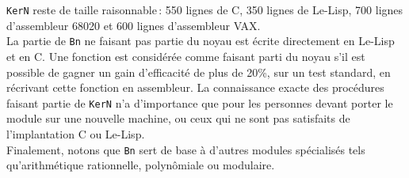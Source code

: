 \verb+KerN+ reste de taille raisonnable\,: 550 lignes de C,
350 lignes de Le-Lisp, 700 lignes d'assembleur 68020 et 600
lignes d'assembleur VAX.
\\
La partie de \verb+Bn+ ne faisant pas partie du noyau est \'ecrite directement
en Le-Lisp et en C. Une fonction est consid\'er\'ee comme faisant parti du noyau
s'il est possible de gagner un gain d'efficacit\'e de plus de 20\%, sur un
test standard, en r\'ecrivant cette fonction en assembleur.
La connaissance exacte des proc\'edures faisant partie de \verb+KerN+
n'a d'importance que pour les personnes devant porter le module sur une
nouvelle machine, ou ceux qui ne sont pas satisfaits de l'implantation C
ou Le-Lisp.
\\
Finalement, notons que \verb+Bn+ sert de base \`a d'autres modules
sp\'ecialis\'es tels qu'arithm\'etique rationnelle, polyn\^omiale ou modulaire.


